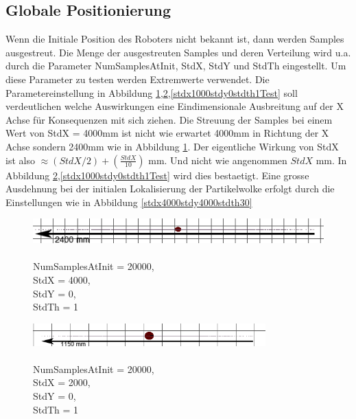 \documentclass{article}
\begin{document}
\subsection{Globale Positionierung}
Wenn die Initiale Position des Roboters nicht bekannt ist, dann werden Samples ausgestreut. Die Menge der ausgestreuten Samples und deren Verteilung wird u.a. durch die Parameter NumSamplesAtInit, StdX, StdY und StdTh eingestellt.
Um diese Parameter zu testen werden Extremwerte verwendet. Die Parametereinstellung in Abbildung \ref{stdx4000stdy0stdth1Test},\ref{stdx2000stdy0stdth1Test},\ref{stdx1000stdy0stdth1Test} soll verdeutlichen welche Auswirkungen eine Eindimensionale Ausbreitung auf der X Achse f\"ur Konsequenzen mit sich ziehen. 
Die Streuung der Samples bei einem Wert von StdX = 4000mm ist nicht wie erwartet 4000mm in Richtung der X Achse sondern 2400mm wie in Abbildung \ref{stdx4000stdy0stdth1Test}. Der eigentliche Wirkung von StdX ist also  $\approx \left(StdX/2\right)+(\frac{StdX}{10})$ mm. Und nicht wie angenommen $StdX$ mm. In Abbildung \ref{stdx2000stdy0stdth1Test},\ref{stdx1000stdy0stdth1Test} wird dies bestaetigt.
Eine grosse Ausdehnung bei der initialen Lokalisierung der Partikelwolke erfolgt durch die Einstellungen wie in Abbildung \ref{stdx4000stdy4000stdth30}

\begin{figure}
	\centering
	\includegraphics[width=1\textwidth]{img/stdx4000stdy0stdth1.png}
	\caption{\\ NumSamplesAtInit = 20000, \\ StdX = 4000,\\ StdY = 0,\\ StdTh = 1}
	\label{stdx4000stdy0stdth1Test}
\end{figure}

\begin{figure}
	\centering
	\includegraphics[width=0.8\textwidth]{img/stdx2000stdy0stdth1.png}
	\caption{\\ NumSamplesAtInit = 20000, \\ StdX = 2000,\\ StdY = 0,\\ StdTh = 1}
	\label{stdx2000stdy0stdth1Test}
\end{figure}
\end{document}
